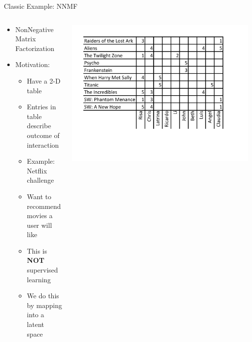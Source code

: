 \documentclass[aspectratio=169]{beamer}
\begin{document}
\begin{frame}{Classic Example: NNMF}

\begin{columns}
\begin{column}{0.5\textwidth}
\begin{itemize}
\item NonNegative Matrix Factorization
\item Motivation:
\begin{itemize}
\item Have a 2-D table
\item Entries in table describe outcome of interaction
\item Example: Netflix challenge
\item Want to recommend movies a user will like
\item This is \textbf{NOT} supervised learning
\item We do this by mapping into a latent space
\end{itemize}
\end{itemize}
 \end{column}
\begin{column}{0.5\textwidth}
    \includegraphics[width=1\textwidth]{lectUL/movieGrid} 
 \end{column}
 \end{columns}

\end{frame}
\end{document}
